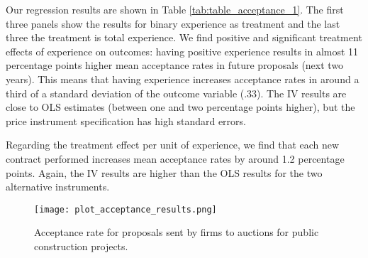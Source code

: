 Our regression results are shown in Table \ref{tab:table_acceptance_1}. The first three panels show the results for binary experience as treatment and the last three the treatment is total experience. We find positive and significant treatment effects of experience on outcomes: having positive experience results in almost 11 percentage points higher mean acceptance rates in future proposals (next two years). This means that having experience increases acceptance rates in around a third of a standard deviation of the outcome variable (.33). The IV results are close to OLS estimates (between one and two percentage points higher), but the price instrument specification has high standard errors.

Regarding the treatment effect per unit of experience, we find that each new contract performed increases mean acceptance rates by around 1.2 percentage points. Again, the IV results are higher than the OLS results for the two alternative instruments.
 \clearpage
\begin{figure}
\centering
  \texttt{[image: plot\_acceptance\_results.png]}
  \caption{Acceptance rate for proposals sent by firms to auctions for public construction projects.}
  \label{fig:plot_acceptance_results}
\end{figure}


